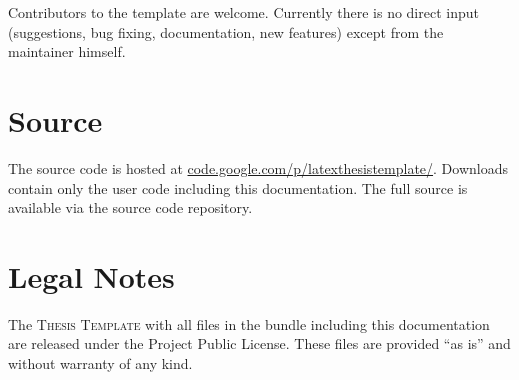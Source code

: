 Contributors to the template are welcome. Currently there is no direct input (suggestions, bug fixing, documentation, new features) except from the maintainer himself.

\section*{Source}
The source code is hosted at \url{code.google.com/p/latexthesistemplate/}. Downloads contain only the user code including this documentation. The full source is available via the source code repository.

\section*{Legal Notes}
The \textsc{\latex Thesis Template} with all files in the bundle including this documentation are released under the \latex Project Public License. These files are provided “as is” and without warranty of any kind.


